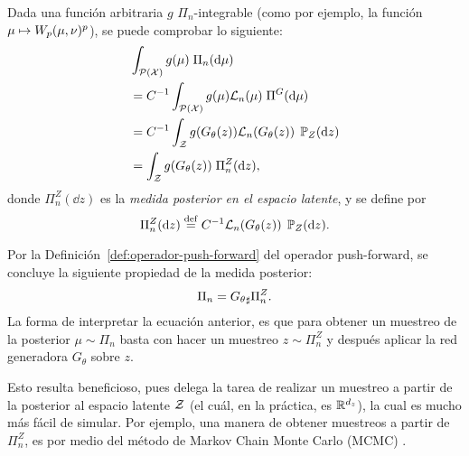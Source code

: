 Dada una función arbitraria $g$ $\Pi_n$-integrable (como por ejemplo, la función $\mu \mapsto \Wasserstein[p]{\mu}{\nu}^p$), se puede comprobar lo siguiente:
\begin{align}
     & \int_{\ProbSpace[\cX]} g(\mu) \; \Pi_n(\dd \mu)                         \\
     & = C^{-1} \int_{\ProbSpace[\cX]} g(\mu) \cL_n(\mu) \; \Pi^G(\dd \mu)     \\
     & = C^{-1} \int_{\cZ} g(G_\theta(z)) \cL_n(G_\theta(z)) \; \Prob_Z(\dd z) \\
     & = \int_{\cZ} g(G_\theta(z)) \; \Pi^Z_n(\dd z),
\end{align}
donde $\Pi^Z_n(\dd z)$ es la \textit{medida posterior en el espacio latente}, y se define por
\begin{equation}
    \Pi^Z_n(\dd z) \eqdef C^{-1} \cL_n(G_\theta(z)) \; \Prob_Z(\dd z).
\end{equation}

Por la Definición~\ref{def:operador-push-forward} del operador push-forward, se concluye la siguiente propiedad de la medida posterior:
\begin{equation}\label{eq:posterior-en-latente}
    \Pi_n = \pf{G_\theta} \Pi^Z_n.
\end{equation}
La forma de interpretar la ecuación anterior, es que para obtener un muestreo de la posterior $\mu\sim\Pi_n$ basta con hacer un muestreo $z\sim\Pi^Z_n$ y después aplicar la red generadora $G_\theta$ sobre $z$.

Esto resulta beneficioso, pues delega la tarea de realizar un muestreo a partir de la posterior al espacio latente $\cZ$ (el cuál, en la práctica, es $\R^{d_z}$), la cual es mucho más fácil de simular. Por ejemplo, una manera de obtener muestreos a partir de $\Pi^Z_n$, es por medio del método de Markov Chain Monte Carlo (MCMC) \cite{andrieu2003introduction,brooks2011handbook,goodman2010ensemble}.








